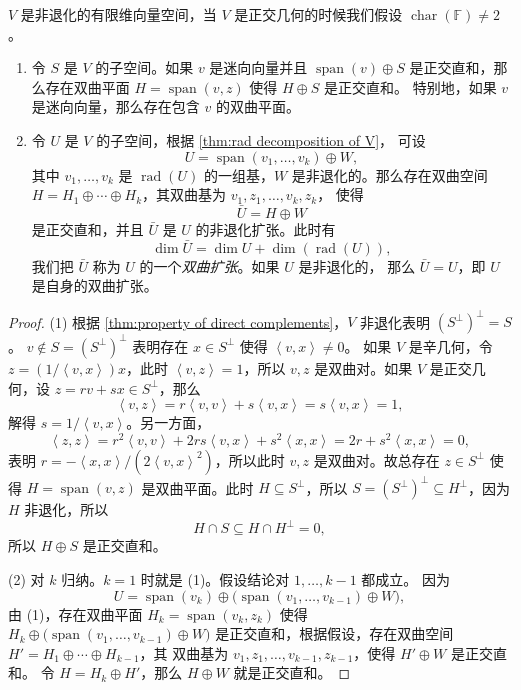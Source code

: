 \documentclass[fontset=none,zihao=-4]{Notes}
\DeclareMathOperator\cha{char}
\DeclareMathOperator\rad{rad}
\newcommand{\inn}[1]{\left\langle#1\right\rangle}
\newcommand{\spa}[1]{\operatorname{span}\left(#1\right)}
\begin{document}
\begin{theorem}
  $V$ 是非退化的有限维向量空间，当 $V$ 是正交几何的时候我们假设
  $\cha(\mathbb{F})\neq 2$。
  \begin{enumerate}
    \item 令 $S$ 是 $V$ 的子空间。如果 $v$ 是迷向向量并且 $\spa{v}\oplus S$
    是正交直和，那么存在双曲平面 $H=\spa{v,z}$ 使得 $H\oplus S$ 是正交直和。
    特别地，如果 $v$ 是迷向向量，那么存在包含 $v$ 的双曲平面。
    \item 令 $U$ 是 $V$ 的子空间，根据 \autoref{thm:rad decomposition of V}，
    可设
    \[
      U=\spa{v_1,\dots,v_k}\oplus W,  
    \]
    其中 $v_1,\dots,v_k$ 是 $\rad(U)$ 的一组基，$W$ 是非退化的。那么存在双曲空间
    $H=H_1\oplus\cdots\oplus H_k$，其双曲基为 $v_1,z_1,\dots,v_k,z_k$，
    使得
    \[
      \bar U=H\oplus W
    \]
    是正交直和，并且 $\bar U$ 是 $U$ 的非退化扩张。此时有
    \[
      \dim\bar U=\dim U+\dim(\rad(U)),
    \]
    我们把 $\bar U$ 称为 $U$ 的一个\emph{双曲扩张}。如果 $U$ 是非退化的，
    那么 $\bar U=U$，即 $U$ 是自身的双曲扩张。 
  \end{enumerate}
\end{theorem}
\begin{proof}
  (1) 根据 \autoref{thm:property of direct complements}，$V$ 非退化表明 $(S^\bot)^\bot=S$。
  $v\notin S=(S^\bot)^\bot$ 表明存在 $x\in S^\bot$ 使得 $\inn{v,x}\neq 0$。
  如果 $V$ 是辛几何，令 $z=(1/\inn{v,x})x$，此时 $\inn{v,z}=1$，所以 $v,z$
  是双曲对。如果 $V$ 是正交几何，设 $z=rv+sx\in S^\bot$，那么
  \[
    \inn{v,z}=  r\inn{v,v}+s\inn{v,x}=s\inn{v,x}=1,
  \]
  解得 $s=1/\inn{v,x}$。另一方面，
  \[
    \inn{z,z}=r^2\inn{v,v}+2rs\inn{v,x}+s^2\inn{x,x}=2r+s^2\inn{x,x}=0,  
  \]
  表明 $r=-\inn{x,x}/(2\inn{v,x}^2)$，所以此时 $v,z$ 是双曲对。故总存在
  $z\in S^\bot$ 使得 $H=\spa{v,z}$ 是双曲平面。此时 $H\subseteq S^\bot$，所以
  $S=(S^\bot)^\bot\subseteq H^\bot$，因为 $H$ 非退化，所以 
  \[
    H\cap S\subseteq H\cap H^\bot =0,  
  \]
  所以 $H\oplus S$ 是正交直和。

  (2) 对 $k$ 归纳。$k=1$ 时就是 (1)。假设结论对 $1,\dots,k-1$ 都成立。
  因为
  \[
    U=\spa{v_k}\oplus\bigl(\spa{v_1,\dots,v_{k-1}}\oplus W\bigr),  
  \]
  由 (1)，存在双曲平面 $H_k=\spa{v_k,z_k}$ 使得 $H_k\oplus \bigl(\spa{v_1,\dots,v_{k-1}}\oplus W\bigr)$
  是正交直和，根据假设，存在双曲空间 $H'=H_1\oplus\cdots\oplus H_{k-1}$，其
  双曲基为 $v_1,z_1,\dots,v_{k-1},z_{k-1}$，使得 $H'\oplus W$ 是正交直和。
  令 $H=H_k\oplus H'$，那么 $H\oplus W$ 就是正交直和。
\end{proof}
\end{document}
